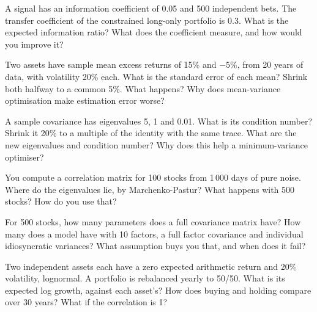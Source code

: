 \begin{question}\label{iq:iv2:portfolio-construction:12}
A signal has an information coefficient of 0.05 and 500 independent bets. The transfer coefficient of the constrained long-only portfolio is 0.3. What is the expected information ratio? What does the coefficient measure, and how would you improve it?
\end{question}

\begin{question}\label{iq:iv2:portfolio-construction:13}
Two assets have sample mean excess returns of 15\% and $-5\%$, from 20 years of data, with volatility 20\% each. What is the standard error of each mean? Shrink both halfway to a common 5\%. What happens? Why does mean-variance optimisation make estimation error worse?
\end{question}

\begin{question}\label{iq:iv2:portfolio-construction:14}
A sample covariance has eigenvalues 5, 1 and 0.01. What is its condition number? Shrink it 20\% to a multiple of the identity with the same trace. What are the new eigenvalues and condition number? Why does this help a minimum-variance optimiser?
\end{question}

\begin{question}\label{iq:iv2:portfolio-construction:15}
You compute a correlation matrix for 100 stocks from 1\,000 days of pure noise. Where do the eigenvalues lie, by Marchenko-Pastur? What happens with 500 stocks? How do you use that?
\end{question}

\begin{question}\label{iq:iv2:portfolio-construction:16}
For 500 stocks, how many parameters does a full covariance matrix have? How many does a model have with 10 factors, a full factor covariance and individual idiosyncratic variances? What assumption buys you that, and when does it fail?
\end{question}

\begin{question}\label{iq:iv2:portfolio-construction:17}
Two independent assets each have a zero expected arithmetic return and 20\% volatility, lognormal. A portfolio is rebalanced yearly to 50/50. What is its expected log growth, against each asset's? How does buying and holding compare over 30 years? What if the correlation is 1?
\end{question}


